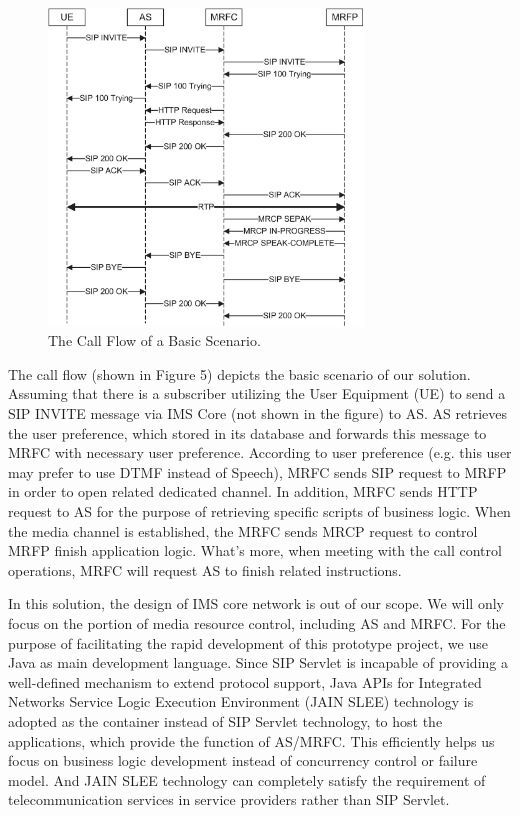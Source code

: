 \documentclass[10pt, conference, a4paper]{IEEEtran}
\begin{document}
\begin{figure}[!t]
\centering
\includegraphics[width=3.3in]{callflow.eps}
\caption{The Call Flow of a Basic Scenario.}
\end{figure}

The call flow (shown in Figure 5) depicts the basic scenario of our solution. Assuming that there is a subscriber utilizing the User Equipment (UE) to send a SIP INVITE message via IMS Core (not shown in the figure) to AS. AS retrieves the user preference, which stored in its database and forwards this message to MRFC with necessary user preference. According to user preference (e.g. this user may prefer to use DTMF instead of Speech), MRFC sends SIP request to MRFP in order to open related dedicated channel. In addition, MRFC sends HTTP request to AS for the purpose of retrieving specific scripts of business logic. When the media channel is established, the MRFC sends MRCP request to control MRFP finish application logic. What's more, when meeting with the call control operations, MRFC will request AS to finish related instructions.

In this solution, the design of IMS core network is out of our scope. We will only focus on the portion of media resource control, including AS and MRFC. For the purpose of facilitating the rapid development of this prototype project, we use Java as main development language. Since SIP Servlet is incapable of providing a well-defined mechanism to extend protocol support, Java APIs for Integrated Networks Service Logic Execution Environment (JAIN SLEE) technology\cite{standard:jslee.v11.specification} is adopted as the container instead of SIP Servlet technology, to host the applications, which provide the function of AS/MRFC. This efficiently helps us focus on business logic development instead of concurrency control or failure model. And JAIN SLEE technology can completely satisfy the requirement of telecommunication services in service providers rather than SIP Servlet\cite{Chrighton:2007gt}. 
\end{document}
